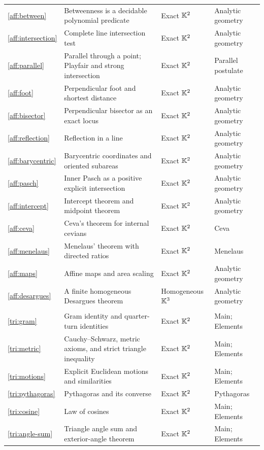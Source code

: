 {\begin{longtable}{@{}>{\raggedright\arraybackslash}p{}>{\raggedright\arraybackslash}p{}>{\raggedright\arraybackslash}p{}>{\raggedright\arraybackslash}p{}@{}}
\ref{aff:between} & Betweenness is a decidable polynomial predicate & Exact $\mathbb K^2$ & Analytic geometry\\
\ref{aff:intersection} & Complete line intersection test & Exact $\mathbb K^2$ & Analytic geometry\\
\ref{aff:parallel} & Parallel through a point; Playfair and strong intersection & Exact $\mathbb K^2$ & Parallel postulate\\
\ref{aff:foot} & Perpendicular foot and shortest distance & Exact $\mathbb K^2$ & Analytic geometry\\
\ref{aff:bisector} & Perpendicular bisector as an exact locus & Exact $\mathbb K^2$ & Analytic geometry\\
\ref{aff:reflection} & Reflection in a line & Exact $\mathbb K^2$ & Analytic geometry\\
\ref{aff:barycentric} & Barycentric coordinates and oriented subareas & Exact $\mathbb K^2$ & Analytic geometry\\
\ref{aff:pasch} & Inner Pasch as a positive explicit intersection & Exact $\mathbb K^2$ & Analytic geometry\\
\ref{aff:intercept} & Intercept theorem and midpoint theorem & Exact $\mathbb K^2$ & Analytic geometry\\
\ref{aff:ceva} & Ceva's theorem for internal cevians & Exact $\mathbb K^2$ & Ceva\\
\ref{aff:menelaus} & Menelaus' theorem with directed ratios & Exact $\mathbb K^2$ & Menelaus\\
\ref{aff:maps} & Affine maps and area scaling & Exact $\mathbb K^2$ & Analytic geometry\\
\ref{aff:desargues} & A finite homogeneous Desargues theorem & Homogeneous $\mathbb K^3$ & Analytic geometry\\
\multicolumn{4}{@{}l}{\textbf{Metric geometry and triangles} (32 declarations)}\\*[2pt]
\ref{tri:gram} & Gram identity and quarter-turn identities & Exact $\mathbb K^2$ & Main; Elements\\
\ref{tri:metric} & Cauchy--Schwarz, metric axioms, and strict triangle inequality & Exact $\mathbb K^2$ & Main; Elements\\
\ref{tri:motions} & Explicit Euclidean motions and similarities & Exact $\mathbb K^2$ & Main; Elements\\
\ref{tri:pythagoras} & Pythagoras and its converse & Exact $\mathbb K^2$ & Pythagoras\\
\ref{tri:cosine} & Law of cosines & Exact $\mathbb K^2$ & Main; Elements\\
\ref{tri:angle-sum} & Triangle angle sum and exterior-angle theorem & Exact $\mathbb K^2$ & Main; Elements\\

\end{longtable}}
